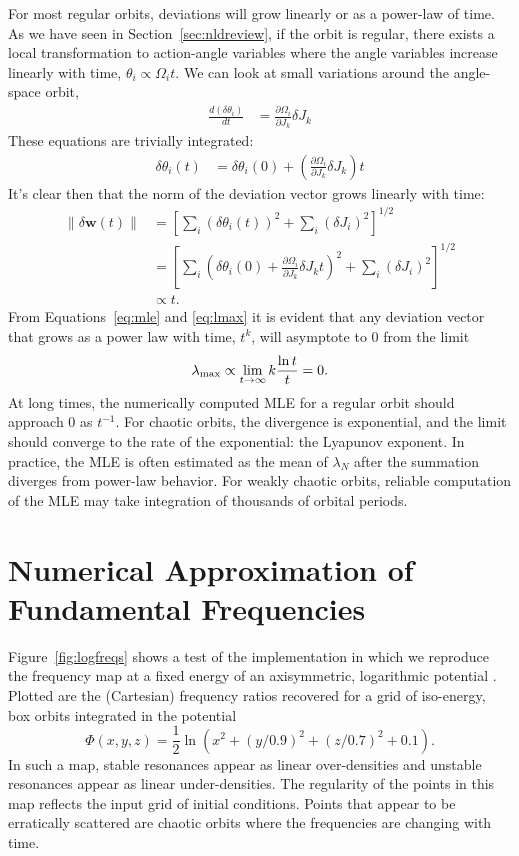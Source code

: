 \documentclass[letterpaper,12pt,preprint]{aastex}
\newcommand{\bs}[1]{\boldsymbol{#1}}
\begin{document}
For most regular orbits, deviations will grow linearly or as a power-law of time. As we have seen in Section~\ref{sec:nldreview}, if the orbit is regular, there exists a local transformation to action-angle variables where the angle variables increase linearly with time, $\theta_i \propto \Omega_i t$. We can look at small variations around the angle-space orbit,
\begin{align}
	\frac{d (\delta \theta_i)}{dt} &= \frac{\partial \Omega_i}{\partial J_k} \delta J_k
\end{align}
These equations are trivially integrated:
\begin{align}
	\delta \theta_i(t) &= \delta \theta_i(0) + \left(\frac{\partial \Omega_i}{\partial J_k} \delta J_k \right) t
\end{align}
It's clear then that the norm of the deviation vector grows linearly with time:
\begin{align}
	\|\delta \bs{w}(t)\| &= \left[\sum_i (\delta \theta_i(t))^2 + \sum_i (\delta J_i)^2\right]^{1/2}\\
	&= \left[\sum_i \left(\delta \theta_i(0) + \frac{\partial \Omega_i}{\partial J_k} \delta J_k t\right)^2 + \sum_i (\delta J_i)^2\right]^{1/2}\\
	&\propto t.
\end{align}
From Equations~\ref{eq:mle} and \ref{eq:lmax} it is evident that any deviation vector that grows as a power law with time, $t^k$, will asymptote to 0 from the limit 
\begin{equation}
	\lambda_{\rm max} \propto \lim_{t\rightarrow \infty} k \frac{\ln t}{t} = 0.
\end{equation}
At long times, the numerically computed MLE for a regular orbit should approach 0 as $t^{-1}$. For chaotic orbits, the divergence is exponential, and the limit should converge to the rate of the exponential: the Lyapunov exponent. In practice, the MLE is often estimated as the mean of $\lambda_N$ after the summation diverges from power-law behavior. For weakly chaotic orbits, reliable computation of the MLE may take integration of thousands of orbital periods.

\section{Numerical Approximation of Fundamental Frequencies}\label{sec:naffapdx}

Figure~\ref{fig:logfreqs} shows a test of the implementation in which we reproduce the frequency map at a fixed energy of an axisymmetric, logarithmic potential \cite[][pg. 260, Figure~3.45]{binneytremaine}. Plotted are the (Cartesian) frequency ratios recovered for a grid of iso-energy, box orbits integrated in the potential
\begin{equation}
	\Phi(x,y,z) = \frac{1}{2}\ln\left(x^2 + (y/0.9)^2 + (z/0.7)^2 + 0.1\right). \label{eq:logpotential}
\end{equation}
In such a map, stable resonances appear as linear over-densities and unstable resonances appear as linear under-densities. The regularity of the points in this map reflects the input grid of initial conditions. Points that appear to be erratically scattered are chaotic orbits where the frequencies are changing with time.
\end{document}
